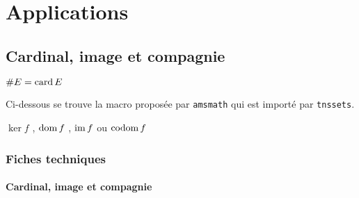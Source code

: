 \documentclass[12pt,a4paper]{article}
\begin{document}
\section{Applications}

\subsection{Cardinal, image et compagnie}


\begin{latexex}
$\card* E = \card E$
\end{latexex}





Ci-dessous se trouve la macro  proposée par \verb+amsmath+ qui est importé par \verb+tnssets+.

\begin{latexex}
$\ker f$ , $\operatorname{\operatorname{dom}} f$ ,
$\operatorname{\operatorname{im}} f$ ou $\operatorname{\operatorname{codom}} f$
\end{latexex}




\subsubsection{Fiches techniques}

\paragraph{Cardinal, image et compagnie}




\separation




\end{document}
